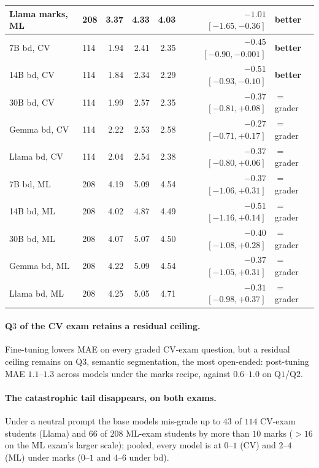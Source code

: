 \begin{table}[t]
\begin{tabular}{llrrrrl}
Llama marks, ML  & 208 & 3.37 & 4.33 & 4.03 & $-1.01$ $[-1.65, -0.36]$ & \textbf{better} \\
\midrule
7B bd, CV        & 114 & 1.94 & 2.41 & 2.35 & $-0.45$ $[-0.90, -0.001]$ & \textbf{better} \\
14B bd, CV       & 114 & 1.84 & 2.34 & 2.29 & $-0.51$ $[-0.93, -0.10]$ & \textbf{better} \\
30B bd, CV       & 114 & 1.99 & 2.57 & 2.35 & $-0.37$ $[-0.81, +0.08]$ & $=$ grader \\
Gemma bd, CV     & 114 & 2.22 & 2.53 & 2.58 & $-0.27$ $[-0.71, +0.17]$ & $=$ grader \\
Llama bd, CV     & 114 & 2.04 & 2.54 & 2.38 & $-0.37$ $[-0.80, +0.06]$ & $=$ grader \\
7B bd, ML        & 208 & 4.19 & 5.09 & 4.54 & $-0.37$ $[-1.06, +0.31]$ & $=$ grader \\
14B bd, ML       & 208 & 4.02 & 4.87 & 4.49 & $-0.51$ $[-1.16, +0.14]$ & $=$ grader \\
30B bd, ML       & 208 & 4.07 & 5.07 & 4.50 & $-0.40$ $[-1.08, +0.28]$ & $=$ grader \\
Gemma bd, ML     & 208 & 4.22 & 5.09 & 4.54 & $-0.37$ $[-1.05, +0.31]$ & $=$ grader \\
Llama bd, ML     & 208 & 4.25 & 5.05 & 4.71 & $-0.31$ $[-0.98, +0.37]$ & $=$ grader \\
\bottomrule
\end{tabular}
\end{table}

\paragraph{Q$3$ of the CV exam retains a residual ceiling.}
Fine-tuning lowers MAE on every graded CV-exam question, but a residual ceiling remains on Q$3$, semantic segmentation, the most open-ended: post-tuning MAE $1.1$--$1.3$ across models under the marks recipe, against $0.6$--$1.0$ on Q$1$/Q$2$.

\paragraph{The catastrophic tail disappears, on both exams.}
Under a neutral prompt the base models mis-grade up to $43$ of $114$ CV-exam students (Llama) and $66$ of $208$ ML-exam students by more than $10$ marks (${>}16$ on the ML exam's larger scale); pooled, every model is at $0$--$1$ (CV) and $2$--$4$ (ML) under marks ($0$--$1$ and $4$--$6$ under bd).

